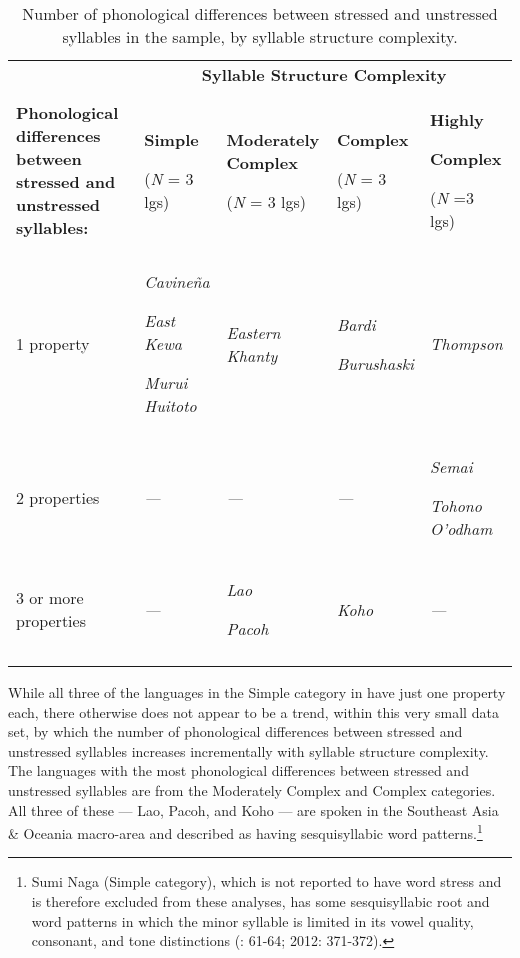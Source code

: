 \begin{table}
\begin{tabularx}{\textwidth}{XXXXX}
\lsptoprule
 & \multicolumn{4}{c}{ \textbf{Syllable Structure Complexity}}\\
 \textbf{Phonological differences between stressed and unstressed syllables:} & { \textbf{Simple}}

 (\textit{N} = 3 lgs) & { \textbf{Moderately Complex}}

 (\textit{N} = 3 lgs) & { \textbf{Complex}}

 (\textit{N} = 3 lgs) & { \textbf{Highly} }

{ \textbf{Complex}}

 (\textit{N} =3 lgs)\\
 1 property & { \textit{Cavineña}}

{ \textit{East Kewa}}

 \textit{Murui Huitoto} & \textit{Eastern Khanty} & { \textit{Bardi}}

 \textit{Burushaski} & \textit{Thompson}\\
 2 properties & \textit{—} & \textit{—} & \textit{—} & { \textit{Semai}}

 \textit{Tohono O’odham}\\
 3 or more properties & \textit{—} & { \textit{Lao}}

 \textit{Pacoh} & \textit{Koho} & \textit{—}\\
\lspbottomrule
\end{tabularx}
\caption{\label{tab:5.11}Number of phonological differences between stressed and unstressed syllables in the sample, by syllable structure complexity.}
\end{table}

  While all three of the languages in the Simple category in  have just one property each, there otherwise does not appear to be a trend, within this very small data set, by which the number of phonological differences between stressed and unstressed syllables increases incrementally with syllable structure complexity. The languages with the most phonological differences between stressed and unstressed syllables are from the Moderately Complex and Complex categories. All three of these — Lao, Pacoh, and Koho — are spoken in the Southeast Asia \& Oceania macro-area and described as having sesquisyllabic word patterns.\footnote{{Sumi Naga (Simple category), which is not reported to have word stress and is therefore excluded from these analyses, has some sesquisyllabic root and word patterns in which the minor syllable is limited in its vowel quality, consonant, and tone distinctions (\citealt{Teo2009}: 61-64; 2012: 371-372).}} 

